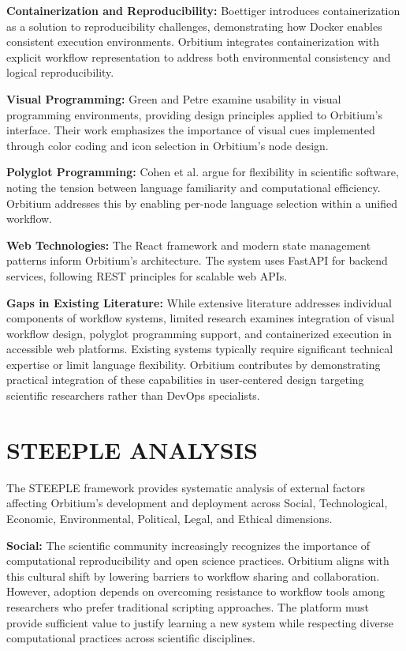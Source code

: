 \documentclass[12pt]{article}
\begin{document}
\textbf{Containerization and Reproducibility:} Boettiger \cite{boettiger2015introduction} introduces containerization as a solution to reproducibility challenges, demonstrating how Docker enables consistent execution environments. Orbitium integrates containerization with explicit workflow representation to address both environmental consistency and logical reproducibility.

\textbf{Visual Programming:} Green and Petre \cite{green1996usability} examine usability in visual programming environments, providing design principles applied to Orbitium's interface. Their work emphasizes the importance of visual cues implemented through color coding and icon selection in Orbitium's node design.

\textbf{Polyglot Programming:} Cohen et al. \cite{cohen2020scientific} argue for flexibility in scientific software, noting the tension between language familiarity and computational efficiency. Orbitium addresses this by enabling per-node language selection within a unified workflow.

\textbf{Web Technologies:} The React framework and modern state management patterns inform Orbitium's architecture. The system uses FastAPI for backend services, following REST principles for scalable web APIs.

\textbf{Gaps in Existing Literature:} While extensive literature addresses individual components of workflow systems, limited research examines integration of visual workflow design, polyglot programming support, and containerized execution in accessible web platforms. Existing systems typically require significant technical expertise or limit language flexibility. Orbitium contributes by demonstrating practical integration of these capabilities in user-centered design targeting scientific researchers rather than DevOps specialists.

\newpage
\section{STEEPLE ANALYSIS}

The STEEPLE framework provides systematic analysis of external factors affecting Orbitium's development and deployment across Social, Technological, Economic, Environmental, Political, Legal, and Ethical dimensions.

\textbf{Social:} The scientific community increasingly recognizes the importance of computational reproducibility and open science practices. Orbitium aligns with this cultural shift by lowering barriers to workflow sharing and collaboration. However, adoption depends on overcoming resistance to workflow tools among researchers who prefer traditional scripting approaches. The platform must provide sufficient value to justify learning a new system while respecting diverse computational practices across scientific disciplines.
\end{document}
